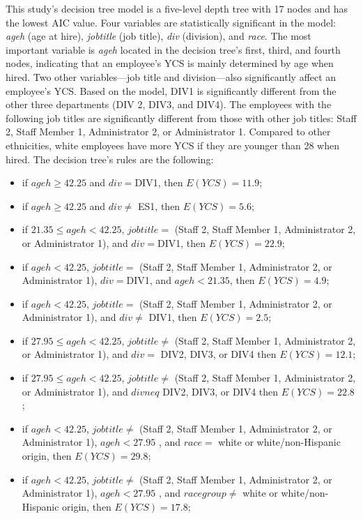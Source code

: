 This study’s decision tree model is a five-level depth tree with 17 nodes and has the lowest AIC value. Four variables are statistically significant in the model: \textit{ageh} (age at hire), \textit{jobtitle} (job title), \textit{div} (division), and \textit{race}. The most important variable is \textit{ageh} located in the decision tree’s first, third, and fourth nodes, indicating that an employee’s YCS is mainly determined by age when hired. Two other variables—job title and division—also significantly affect an employee's YCS. Based on the model, DIV1 is significantly different from the other three departments (DIV 2, DIV3, and DIV4). The employees with the following job titles are significantly different from those with other job titles: Staff 2, Staff Member 1, Administrator 2, or Administrator 1. Compared to other ethnicities, white employees have more YCS if they are younger than 28 when hired. The decision tree’s rules are the following:
\begin{itemize}
	\item if $ageh \ge 42.25 $ and $div=$DIV1, then  $E(YCS)=11.9$;
	\item if $ageh \ge  42.25$ and $div\neq$ ES1, then $E(YCS)=5.6$;
	\item if $21.35 \le ageh < 42.25$, $job title =$ (Staff 2, Staff Member 1, Administrator 2, or Administrator 1), and $div= $DIV1, then $E(YCS)=22.9$;
	\item if $ageh < 42.25$, $job title =$ (Staff 2, Staff Member 1, Administrator 2, or Administrator 1), $div= $DIV1, and $ageh < 21.35$, then $E(YCS)=4.9$;
	\item if $ageh < 42.25$, $job title =$ (Staff 2, Staff Member 1, Administrator 2, or Administrator 1), and $div\neq$ DIV1, then $E(YCS)=2.5$;
	\item if $27.95 \le ageh < 42.25$, $job title \neq $ (Staff 2, Staff Member 1, Administrator 2, or Administrator 1), and $div=$ DIV2, DIV3, or DIV4 then $E(YCS)=12.1$;
	\item if $27.95 \le ageh < 42.25$, $job title \neq $ (Staff 2, Staff Member 1, Administrator 2, or Administrator 1), and $div neq$ DIV2, DIV3, or DIV4 then $E(YCS)=22.8$;
	\item if $ ageh < 42.25 $, $job title \neq $ (Staff 2, Staff Member 1, Administrator 2, or Administrator 1), $ageh<27.95$ , and $race=$ white or white/non-Hispanic origin, then $E(YCS)=29.8$;
	\item if $ ageh < 42.25 $, $job title \neq $ (Staff 2, Staff Member 1, Administrator 2, or Administrator 1), $ageh<27.95$ , and $racegroup\neq$ white or white/non-Hispanic origin, then $E(YCS)=17.8$;
	
\end{itemize}


